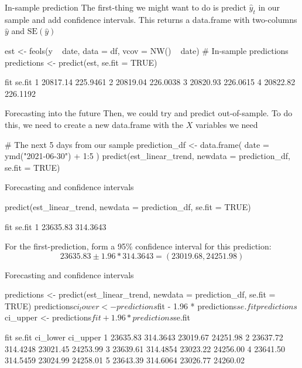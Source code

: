 \documentclass[aspectratio=169,t,11pt,table]{beamer}
\begin{document}
\begin{frame}[fragile]{In-sample prediction}
  The first-thing we might want to do is predict $\hat{y}_t$ in our sample and add confidence intervals. This returns a data.frame with two-columns $\hat{y}$ and $\text{SE}(\hat{y})$
  
  \begin{codeblock}
est <- feols(y ~ date, data = df, vcov = NW() ~ date)
# In-sample predictions
predictions <- predict(est, se.fit = TRUE)
  \end{codeblock}
  \begin{codeblock}[{}]
       fit   se.fit
1 20817.14 225.9461
2 20819.04 226.0038
3 20820.93 226.0615
4 20822.82 226.1192
  \end{codeblock}
\end{frame}

\begin{frame}[fragile]{Forecasting into the future}
  Then, we could try and predict out-of-sample. To do this, we need to create a new data.frame with the $X$ variables we need

  \begin{codeblock}
# The next 5 days from our sample
prediction_df <- data.frame(
  date = ymd("2021-06-30") + 1:5
)
predict(est_linear_trend, newdata = prediction_df, se.fit = TRUE)
  \end{codeblock}
\end{frame}

\begin{frame}[fragile]{Forecasting and confidence intervals}
  \begin{codeblock}
predict(est_linear_trend, newdata = prediction_df, se.fit = TRUE)
  \end{codeblock}
  \begin{codeblock}[{}]
       fit   se.fit
1 23635.83 314.3643
  \end{codeblock}

  For the first-prediction, form a 95\% confidence interval for this prediction:
  \pause
  $$
    23635.83 \pm 1.96 * 314.3643 = (23019.68, 24251.98)
  $$
\end{frame}

\begin{frame}[fragile]{Forecasting and confidence intervals}
  \begin{codeblock}
predictions <- 
  predict(est_linear_trend, newdata = prediction_df, se.fit = TRUE)
predictions$ci_lower <- predictions$fit - 1.96 * predictions$se.fit
predictions$ci_upper <- predictions$fit + 1.96 * predictions$se.fit
  \end{codeblock}

  \begin{codeblock}[{}]
       fit   se.fit ci_lower ci_upper
1 23635.83 314.3643 23019.67 24251.98
2 23637.72 314.4248 23021.45 24253.99
3 23639.61 314.4854 23023.22 24256.00
4 23641.50 314.5459 23024.99 24258.01
5 23643.39 314.6064 23026.77 24260.02
  \end{codeblock}
\end{frame}
\end{document}
